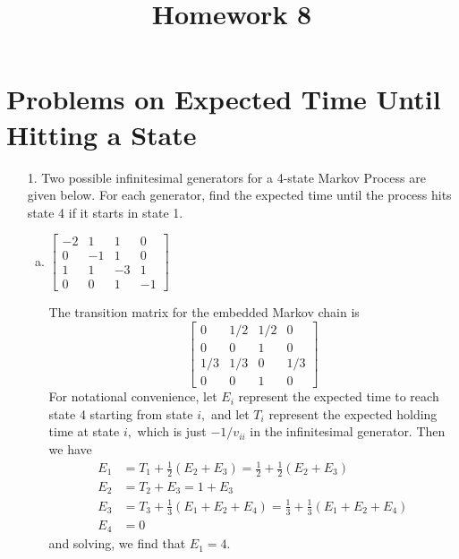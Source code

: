 \documentclass{article}
\begin{document}
\title{Homework 8}
\maketitle
\thispagestyle{fancy}

\section*{Problems on Expected Time Until Hitting a State}

\begin{itemize}
	\item[1.] Two possible infinitesimal generators for a 4-state Markov Process are given below. For each generator, find the expected time until the process hits state 4 if it starts in state 1.
		\begin{enumerate}[(a)]
			\item $\begin{bmatrix}
					-2 & 1 & 1 & 0 \\ 
					0 & -1 & 1 & 0 \\
					1 & 1 & -3 & 1 \\
					0 & 0 & 1 & -1
				\end{bmatrix}$
				\begin{soln}
					The transition matrix for the embedded Markov chain is
					\[\begin{bmatrix}
							0 & 1/2 & 1/2 & 0 \\
							0 & 0 & 1 & 0 \\
							1/3 & 1/3 & 0 & 1/3 \\
							0 & 0 & 1 & 0
					\end{bmatrix}\]
					For notational convenience, let $E_i$ represent the expected time to reach state 4 starting from state $i,$ and let $T_i$ represent the expected holding time at state $i,$ which is just $-1/v_{ii}$ in the infinitesimal generator. Then we have
					\begin{align*}
						E_1 &= T_1 + \frac{1}{2} \left( E_2 + E_3 \right) = \frac{1}{2} + \frac{1}{2} \left( E_2 + E_3 \right) \\
						E_2 &= T_2 + E_3 = 1+E_3 \\
						E_3 &= T_3 + \frac{1}{3}\left( E_1+E_2 + E_4 \right) = \frac{1}{3} + \frac{1}{3} \left( E_1+E_2+E_4 \right) \\
						E_4 &= 0
					\end{align*}
					and solving, we find that $E_1=4.$
				\end{soln}


\end{enumerate}
\end{itemize}
\end{document}
